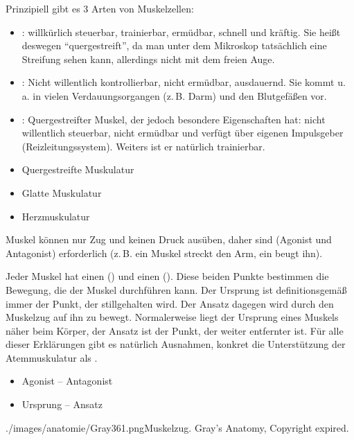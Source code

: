 {
Prinzipiell gibt es 3  Arten von Muskelzellen:

\begin{itemize}
  \item {}:
  willkürlich steuerbar, trainierbar, er\-müd\-bar,  schnell und
  kräftig. Sie heißt deswegen
  \enquote{quergestreift}, da man unter dem
  Mikroskop tatsächlich eine Streifung sehen kann, allerdings nicht mit
  dem freien Auge.
  \item {}: Nicht willentlich
  kontrollierbar, nicht ermüdbar, ausdauernd.
  Sie kommt u.\,a. in vielen
  Verdauungsorgangen (z.\,B. Darm) und den Blutgefäßen vor.
  \item {}: Quergestreifter Muskel, der
  jedoch besondere Eigenschaften hat: nicht willentlich
  steuerbar, nicht ermüdbar und verfügt über eigenen
  Impulsgeber (Reizleitungssystem). Weiters ist er natürlich
  trainierbar.
\end{itemize}

}
{
\begin{itemize}
  \item Quergestreifte Muskulatur
  \item Glatte Muskulatur
  \item Herzmuskulatur
\end{itemize}
}
{}{}{}

{%
Muskel können nur Zug und keinen
Druck ausüben, daher sind  (Agonist und
Antagonist) erforderlich (z.\,B. ein Muskel streckt den Arm,
ein  beugt ihn).

Jeder Muskel hat einen 
() und einen
 ().
Diese beiden Punkte bestimmen die Bewegung, die der Muskel
durchführen kann. Der Ursprung ist definitionsgemäß immer
der Punkt, der stillgehalten wird. Der Ansatz dagegen wird
durch den Muskelzug auf ihn zu bewegt. Normalerweise liegt
der Ursprung eines Muskels näher beim Körper, der Ansatz ist
der Punkt, der weiter entfernter ist. Für alle dieser
Erklärungen gibt es natürlich Ausnahmen, konkret die
Unterstützung der Atemmuskulatur als
.
}
{
\begin{itemize}
  \item Agonist -- Antagonist
  \item Ursprung -- Ansatz
\end{itemize}
}
{./images/anatomie/Gray361.png}{\AuthNotesPicLegalOk{}{}Muskelzug. }{Gray's Anatomy, Copyright expired.}






